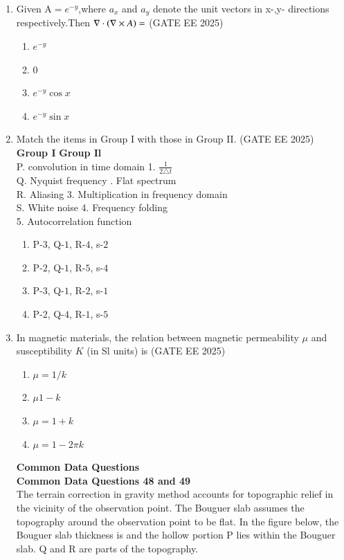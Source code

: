 \documentclass[journal]{IEEEtran}
\begin{document}
\begin{enumerate}[start=26]
\item Given A$=e^{-y}$,where ${a_x}$ and $a_y$ denote the unit vectors in x-,y- directions respectively.Then $\nabla\cdot\left(\nabla \times A\right)=$
\hfill{(GATE EE 2025)}
\begin{enumerate}
    \item $e^{-y}$
    \item 0
    \item $e^{-y}\cos{x}$
    \item $e^{-y}\sin{x}$
\end{enumerate}
\item Match the items in Group I with those in Group II.
\hfill{(GATE EE 2025)}\\
\vspace{0cm}
\textbf{Group I} \hspace{4.4cm}
\textbf{Group Il}\\
P. convolution in time domain \quad \quad \quad \quad \hspace{0.2cm}1. $\frac{1}{2\triangle t}$\\
Q. Nyquist frequency \qquad \qquad \qquad {}. Flat spectrum\\
R. Aliasing \qquad \qquad \qquad \qquad \hspace{1.5cm}3. Multiplication in frequency domain\\
S. White noise \qquad \qquad \qquad \qquad \hspace{0.9cm} 4. Frequency folding\\
\hspace*{6cm} 5. Autocorrelation function
\begin{enumerate}
    \item P-$3$, Q-$1$, R-$4$, s-$2$
    \item P-$2$, Q-$1$, R-$5$, s-$4$
     \item P-$3$, Q-$1$, R-$2$, s-$1$
      \item P-$2$, Q-$4$, R-$1$, s-$5$
\end{enumerate}

\item In magnetic materials, the relation between magnetic permeability $\mu$ and susceptibility $K$ (in Sl units) is
\hfill{(GATE EE 2025)}
\begin{enumerate}
    \item $\mu =1/k$
    \item $\mu 1-k$
    \item $\mu=1+k$
    \item $\mu=1-2\pi k$
\end{enumerate}
\vspace{0.7cm}
\textbf{Common Data Questions}\\
\vspace{0.6cm}
\textbf{Common Data Questions 48 and 49}\\
The terrain correction in gravity method accounts for topographic relief in the vicinity of the observation point. The Bouguer slab assumes the topography around the observation point to be flat. In the figure below, the Bouguer slab thickness is and the hollow portion P lies within the Bouguer slab. Q and R are parts of the topography.


\end{enumerate}
\end{document}
